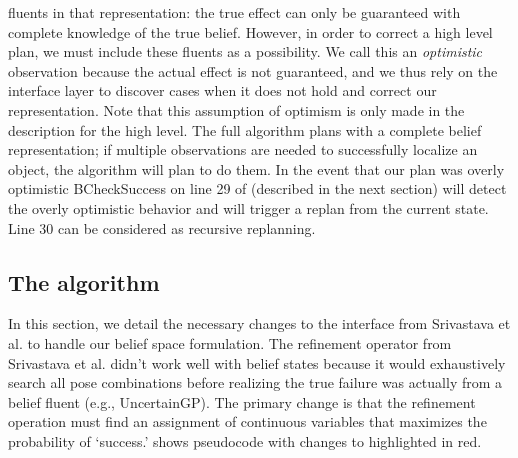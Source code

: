 fluents in that representation: the true effect can only be guaranteed
with complete knowledge of the true belief. However,
in order to correct a high level plan, we must include these fluents as a
possibility. We call this an \emph{optimistic} observation because the actual
effect is not guaranteed, and we thus rely on the interface layer to discover
cases when it does not hold and correct our representation. Note that
this assumption of optimism is only made in the description for the high
level. The full algorithm plans with a complete belief representation; if
multiple observations are needed to successfully localize an object, the algorithm
will plan to do them. In the event that our plan was overly optimistic BCheckSuccess on line 29 of  (described in the next section) will detect the overly optimistic behavior and will trigger a replan from the current state. Line 30 can be considered as recursive replanning.

\subsection{The \ibsp{} algorithm}
\label{sec-ibsp}
In this section, we detail the necessary changes to the interface from
Srivastava et al. to handle our belief space formulation. The refinement operator from Srivastava et al. didn't work well with belief states because it would exhaustively search all pose combinations before realizing the true failure was actually from a belief fluent (e.g., UncertainGP). The primary
change is that the refinement operation must find an assignment of
continuous variables that maximizes the probability of
`success.'  shows pseudocode with changes to  highlighted in red.

